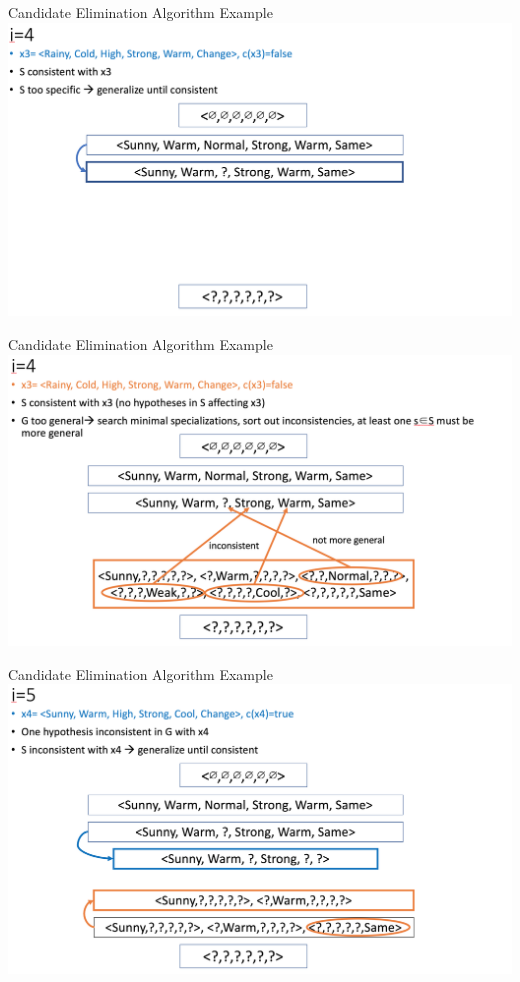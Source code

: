 \documentclass{beamer}
\begin{document}
\begin{frame}{Candidate Elimination Algorithm Example}
\centering
\includegraphics[width=1.1\textwidth]{cea_4}
\end{frame}

\begin{frame}{Candidate Elimination Algorithm Example}
\centering
\includegraphics[width=1.1\textwidth]{cea_5}
\end{frame}

\begin{frame}{Candidate Elimination Algorithm Example}
\centering
\includegraphics[width=1.1\textwidth]{cea_6}
\end{frame}
\end{document}
